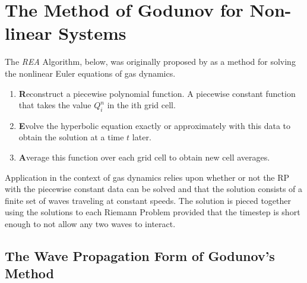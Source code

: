 \documentclass[]{article}
\begin{document}
\section{The Method of Godunov for Non-linear Systems}
	The \textit{REA} Algorithm, below, was originally proposed by \cite{Godunov:1959} as a method for solving the nonlinear Euler equations of gas dynamics.
	\begin{enumerate}
		\item \textbf{R}econstruct a piecewise polynomial function. A piecewise constant function that takes the value $ Q_i^n $ in the ith grid cell.
		\item  \textbf{E}volve the hyperbolic equation exactly or approximately with this data to obtain the solution at a time $ t $ later.
		\item \textbf{A}verage this function over each grid cell to obtain new cell averages.
	\end{enumerate}
	Application in the context of gas dynamics relies upon whether or not the RP with the piecewise constant data can be solved and that the solution consists of a finite set of waves traveling at constant speeds. The solution is pieced together using the solutions to each Riemann Problem provided that the timestep is short enough to not allow any two waves to interact.
	
	\subsection{The Wave Propagation Form of Godunov's Method}
	
\end{document}
